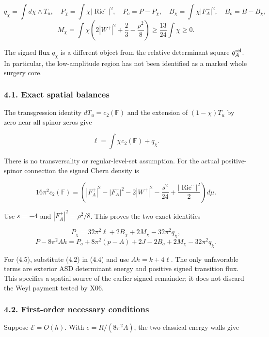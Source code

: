 \documentclass[
  10pt,
]{article}
\begin{document}
\[
 q_\chi=\int d\chi\wedge T_u,\quad
 P_\chi=\int\chi|\operatorname{Ric}^{\circ}|^2,\quad P_o=P-P_\chi,
 \quad B_\chi=\int\chi|F_A^-|^2,\quad B_o=B-B_\chi,
\] \[
 M_\chi=\int\chi\left(2|W^+|^2+\frac23-\frac{\rho^2}{8}\right)
                         \ge\frac{13}{24}\int\chi\ge0.
 \tag{4.3}
\]

The signed flux \(q_\chi\) is a different object from the relative
determinant square \(q_A^{\rm rel}\). In particular, the low-amplitude
region has not been identified as a marked whole surgery core.

\hypertarget{exact-spatial-balances}{%
\subsubsection{4.1. Exact spatial
balances}\label{exact-spatial-balances}}

The transgression identity \(dT_u=c_2(\mathbb F)\) and the extension of
\((1-\chi)T_u\) by zero near all spinor zeros give

\[
 \ell=\int\chi c_2(\mathbb F)+q_\chi.
\]

There is no transversality or regular-level-set assumption. For the
actual positive-spinor connection the signed Chern density is

\[
 16\pi^2c_2(\mathbb F)=
 \left(|F_A^+|^2-|F_A^-|^2-2|W^+|^2
             -\frac{s^2}{24}+\frac{|\operatorname{Ric}^{\circ}|^2}{2}\right)d\mu.
\]

Use \(s=-4\) and \(|F_A^+|^2=\rho^2/8\). This proves the two exact
identities

\[
 \boxed{P_\chi=32\pi^2\ell+2B_\chi+2M_\chi-32\pi^2q_\chi,}
 \tag{4.4}
\] \[
 \boxed{P-8\pi^2Ah=P_o+8\pi^2(p-A)+2J-2B_o
                              +2M_\chi-32\pi^2q_\chi.}
 \tag{4.5}
\]

For (4.5), substitute (4.2) in (4.4) and use \(Ah=k+4\ell\). The only
unfavorable terms are exterior ASD determinant energy and positive
signed transition flux. This specifies a spatial source of the earlier
signed remainder; it does not discard the Weyl payment tested by X06.

\hypertarget{first-order-necessary-conditions}{%
\subsubsection{4.2. First-order necessary
conditions}\label{first-order-necessary-conditions}}

Suppose \(\mathcal E=O(h)\). With \(e=R/(8\pi^2A)\), the two classical
energy walls give
\end{document}
